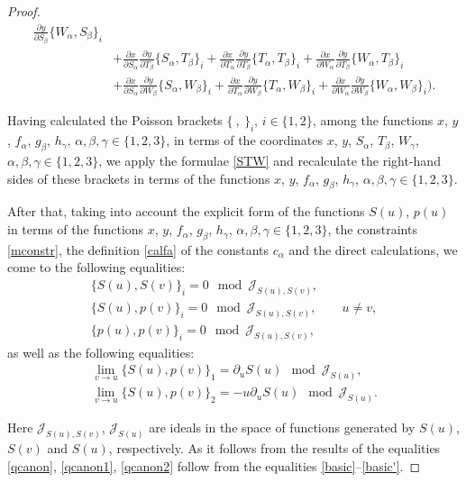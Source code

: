 \documentclass[pdftex]{sigma}
\def\a{\alpha}
\def\b{\beta}
\def\g{\gamma}
\numberwithin{equation}{section}
\begin{document}
\begin{proof}
\begin{align*}
\frac{\partial y}{\partial S_{ \b}}\{W_{\a},S_{\b}\}_i
 \\
 &+ \frac{\partial x}{\partial S_{ \a}}
\frac{\partial y}{\partial T_{ \b}}\{S_{\a},T_{\b}\}_i+ \frac{\partial x}{\partial T_{ \a}} \frac{\partial y}{\partial
T_{ \b}}\{T_{\a},T_{\b}\}_i +\frac{\partial x}{\partial W_{ \a}}
\frac{\partial y}{\partial T_{ \b}}\{W_{\a},T_{\b}\}_i
\\
&+ \frac{\partial x}{\partial S_{ \a}}
\frac{\partial y}{\partial W_{ \b}}\{S_{\a},W_{\b}\}_i+ \frac{\partial x}{\partial T_{ \a}} \frac{\partial y}{\partial
W_{ \b}}\{T_{\a},W_{\b}\}_i +\frac{\partial x}{\partial W_{ \a}}
\frac{\partial y}{\partial W_{ \b}}\{W_{\a},W_{\b}\}_i \biggr).
\end{align*}

Having calculated the Poisson brackets $\{\ ,\ \}_i$, $i\in \{1,2\}$, among the functions $x$, $y$, $f_{\a}$, $g_{\b}$, $h_{\g}$, $\a,\b,\g \in \{1,2,3\}$, in terms of the coordinates $x$, $y$, $S_{\a}$, $T_{\b}$, $W_{\g}$, $\a,\b,\g \in \{1,2,3\}$, we apply the formulae \eqref{STW} and recalculate the right-hand sides of these brackets in terms of the functions $x$, $y$, $f_{\a}$, $g_{\b}$, $h_{\g}$, $\a,\b,\g \in \{1,2,3\}$.

After that, taking into account the explicit form of the functions $S(u)$, $p(u)$ in terms of the functions $x$, $y$, $f_{\a}$, $g_{\b}$, $h_{\g}$, $\a,\b,\g \in \{1,2,3\}$, the constraints \eqref{mconstr}, the definition \eqref{calfa} of the constants $c_{\a}$ and the direct calculations, we come to the following equalities:
\begin{subequations}\label{basic}
\begin{gather}
\{ S(u), S(v)\}_i= 0 \mod \mathcal{J}_{S(u), S(v)},
\\
\{ S(u), p(v)\}_i= 0 \mod \mathcal{J}_{S(u), S(v)}, \qquad u\neq v,
\\
\{ p(u), p(v)\}_i= 0 \mod \mathcal{J}_{S(u), S(v)},
\end{gather}
\end{subequations}
as well as the following equalities:{\samepage
\begin{gather}
\lim_{v\rightarrow u} \{ S(u), p(v)\}_1= \partial_{u} S(u) \mod \mathcal{J}_{S(u)}, \nonumber\\
 \lim_{v\rightarrow u} \{ S(u), p(v)\}_2= - u \partial_{u} S(u) \mod \mathcal{J}_{S(u)}.\label{basic'}
\end{gather}}%

\noindent
Here $\mathcal{J}_{S(u), S(v)}$, $\mathcal{J}_{S(u)}$ are ideals in the space of functions generated by $S(u)$, $S(v)$ and $S(u)$, respectively.
As it follows from the results of \cite{SkrDub2018} the equalities \eqref{qcanon}, \eqref{qcanon1}, \eqref{qcanon2} follow from the equalities \eqref{basic}--\eqref{basic'}.



\end{proof}
\end{document}
